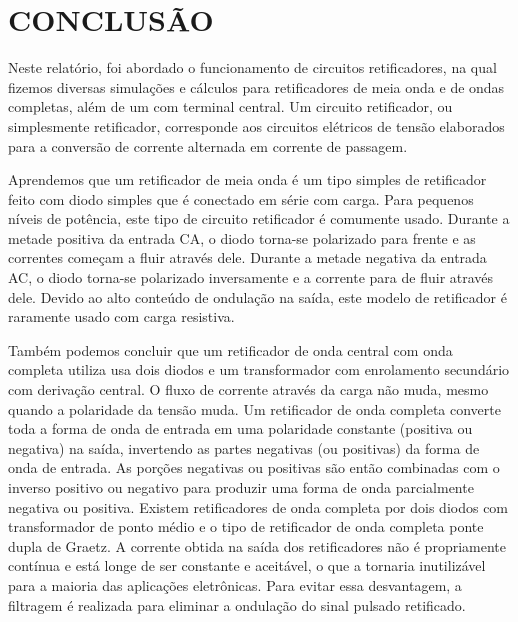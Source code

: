 \chapter{CONCLUSÃO}

Neste relatório, foi abordado o funcionamento de circuitos retificadores, na qual fizemos diversas simulações e cálculos para retificadores de meia onda e de ondas completas, além de um com terminal central. Um circuito retificador, ou simplesmente retificador, corresponde aos circuitos elétricos de tensão elaborados para a conversão de corrente alternada em corrente de passagem.

Aprendemos que um retificador de meia onda é um tipo simples de retificador feito com diodo simples que é conectado em série com carga. Para pequenos níveis de potência, este tipo de circuito retificador é comumente usado. Durante a metade positiva da entrada CA, o diodo torna-se polarizado para frente e as correntes começam a fluir através dele. Durante a metade negativa da entrada AC, o diodo torna-se polarizado inversamente e a corrente para de fluir através dele. Devido ao alto conteúdo de ondulação na saída, este modelo de retificador é raramente usado com carga resistiva.

Também podemos concluir que um retificador de onda central com onda completa utiliza usa dois diodos e um transformador com enrolamento secundário com derivação central. O fluxo de corrente através da carga não muda, mesmo quando a polaridade da tensão muda. Um retificador de onda completa converte toda a forma de onda de entrada em uma polaridade constante (positiva ou negativa) na saída, invertendo as partes negativas (ou positivas) da forma de onda de entrada. As porções negativas ou positivas são então combinadas com o inverso positivo ou negativo para produzir uma forma de onda parcialmente negativa ou positiva.  Existem retificadores de onda completa por dois diodos com transformador de ponto médio e o tipo de retificador de onda completa ponte dupla de Graetz. A corrente obtida na saída dos retificadores não é propriamente contínua e está longe de ser constante e aceitável, o que a tornaria inutilizável para a maioria das aplicações eletrônicas. Para evitar essa desvantagem, a filtragem é realizada para eliminar a ondulação do sinal pulsado retificado.
